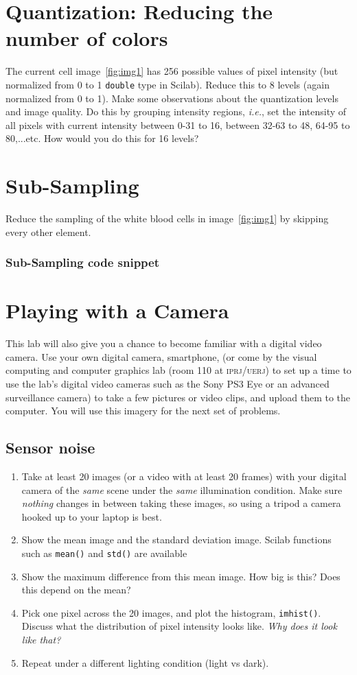 \documentclass[a4paper]{article}
\newcommand{\code}[2]{
 \vspace{1em}
 \subsubsection*{#1}
 
}
\newcommand{\ie}{{\it i.e.}}
\begin{document}
\section{Quantization: Reducing the number of colors}
The current cell image~\ref{fig:img1} has 256 possible values of pixel
intensity (but normalized from 0 to 1 \texttt{double} type in Scilab). 
Reduce
this to 8 levels (again normalized from 0 to 1). Make some observations about the quantization levels and image
quality. Do this by grouping intensity regions, \ie, set the intensity of all
pixels with current intensity between 0-31 to 16, between 32-63 to 48, 64-95 to
80,...etc.  How would you do this for 16 levels?

\section{Sub-Sampling}
Reduce the sampling of the white blood cells in image~\ref{fig:img1} by skipping
every other element.
\code{Sub-Sampling  code snippet}{sampling-code.sci}

\section{Playing with a Camera}

This lab will also give you a chance to become familiar with a digital video camera.
Use your own digital camera, smartphone, (or come by the visual computing and
computer graphics lab (room 110 at
\textsc{iprj/uerj}) to set up
a time to use the lab's digital video cameras such as the Sony PS3 Eye or 
an advanced surveillance camera) to take a few pictures or video clips, and upload them
to the computer. You will use this imagery for the next set of problems.

\subsection{Sensor noise}

\begin{enumerate}
\item Take at least 20 images (or a video with at least 20 frames) with your digital camera 
of the \textit{same} scene under the \textit{same}
illumination condition. Make sure \emph{nothing} changes in between taking these
images, so using a tripod a camera hooked up to your laptop is best.
\item Show the mean image and the standard deviation image. Scilab functions 
such as \texttt{mean()} and \texttt{std()} are available
\item Show the maximum difference from this mean image. How big is this? Does this depend
on the mean?
\item Pick one pixel across the 20 images, and plot the histogram,
\texttt{imhist()}. Discuss what the distribution of pixel intensity looks like.  \emph{Why does it
look like that?}
\item Repeat under a different lighting condition (light vs dark).
\end{enumerate}
\end{document}
